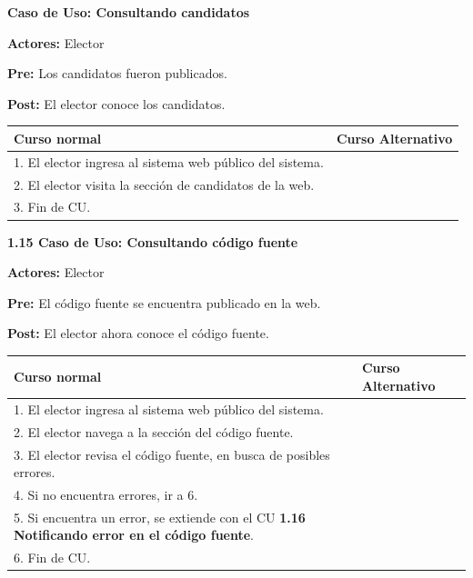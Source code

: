 	

\textbf{Caso de Uso: Consultando candidatos}

\textbf{Actores:} Elector 

\textbf{Pre:} Los candidatos fueron publicados.

\textbf{Post:}  El elector conoce los candidatos.
\begin{table}[h!]
	
 \begin{tabular}{|p{7.5cm} | p{7.5cm}|} 
 \hline
 \textbf{Curso normal} & \textbf{Curso Alternativo} \\
 \hline
 
1. El elector ingresa al sistema web público del sistema. & \\
 \hline



2. El elector visita la sección de candidatos de la web. & \\
 \hline


3. Fin de CU. & \\
 \hline


 \end{tabular}

\end{table}


\textbf{1.15 Caso de Uso: Consultando código fuente}

\textbf{Actores:} Elector

\textbf{Pre:} El código fuente se encuentra publicado en la web.

\textbf{Post:} El elector ahora conoce el código fuente.

\begin{table}[h!]
	
 \begin{tabular}{|p{7.5cm} | p{7.5cm}|} 
 \hline
 \textbf{Curso normal} & \textbf{Curso Alternativo} \\
 \hline
1. El elector ingresa al sistema web público del sistema. & \\
 \hline


2. El elector navega a la sección del código fuente. & \\
 \hline


3. El elector revisa el código fuente, en busca de posibles errores. & \\
 \hline


4. Si no encuentra errores, ir a 6. & \\
 \hline


5. Si encuentra un error, se extiende con el CU \textbf{1.16 Notificando error en el código fuente}. & \\
 \hline


6. Fin de CU. & \\
 \hline

 \end{tabular}

\end{table}



